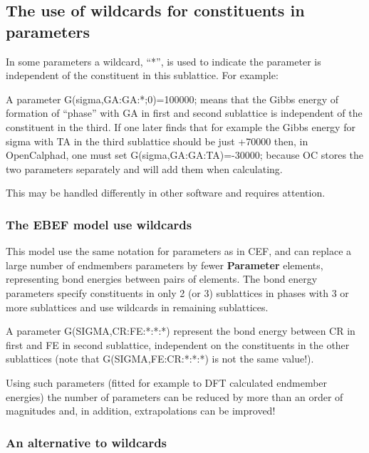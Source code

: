 \documentclass{article}
\begin{document}

\newpage 

\subsection{The use of wildcards for constituents in parameters}\label{sec:wildcard}

In some parameters a wildcard, ``*'', is used to indicate the
parameter is independent of the constituent in this sublattice.  For
example:

A parameter G(sigma,GA:GA:*;0)=100000; means that the Gibbs energy of
formation of ``phase'' with GA in first and second sublattice is
independent of the constituent in the third.  If one later finds that
for example the Gibbs energy for sigma with TA in the third sublattice
should be just +70000 then, in OpenCalphad, one must set
G(sigma,GA:GA:TA)=-30000; because OC stores the two parameters
separately and will add them when calculating.

This may be handled differently in other software and requires attention.

\subsubsection{The EBEF model use wildcards}

This model use the same notation for parameters as in CEF, and can
replace a large number of endmembers parameters by fewer {\bf
  Parameter} elements, representing bond energies between pairs of
elements.  The bond energy parameters specify constituents in only 2
(or 3) sublattices in phases with 3 or more sublattices and use
wildcards in remaining sublattices.

A parameter G(SIGMA,CR:FE:*:*:*) represent the bond energy between CR
in first and FE in second sublattice, independent on the constituents
in the other sublattices (note that G(SIGMA,FE:CR:*:*:*) is not the
same value!).

Using such parameters (fitted for example to DFT calculated endmember
energies) the number of parameters can be reduced by more than an
order of magnitudes and, in addition, extrapolations can be improved!

\subsubsection{An alternative to wildcards}
\end{document}
